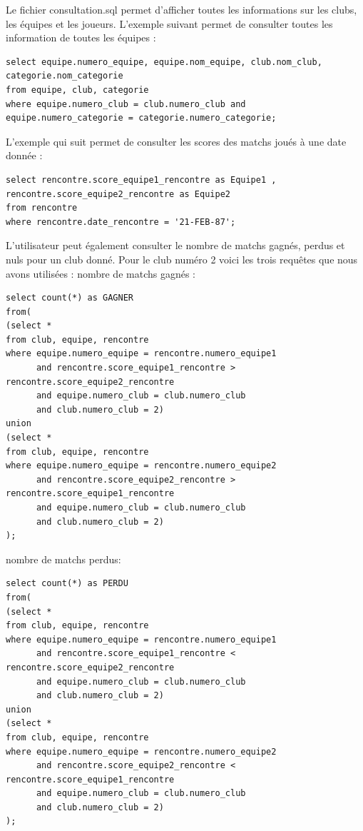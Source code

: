\documentclass{article}
\begin{document}
Le fichier consultation.sql permet d'afficher toutes les informations sur les clubs, les équipes et les joueurs. 
L'exemple suivant permet de consulter toutes les information de toutes les équipes : \\

\begin{verbatim}
select equipe.numero_equipe, equipe.nom_equipe, club.nom_club, categorie.nom_categorie
from equipe, club, categorie
where equipe.numero_club = club.numero_club and equipe.numero_categorie = categorie.numero_categorie;
\end{verbatim}

L'exemple qui suit permet de consulter les scores des matchs joués à une date donnée : \\

\begin{verbatim}
select rencontre.score_equipe1_rencontre as Equipe1 , rencontre.score_equipe2_rencontre as Equipe2
from rencontre
where rencontre.date_rencontre = '21-FEB-87'; 
\end{verbatim}

L'utilisateur peut également consulter le nombre de matchs gagnés, perdus et nuls pour un club donné.
Pour le club numéro 2 voici les trois requêtes que nous avons utilisées :
nombre de matchs gagnés : \\

\begin{verbatim}
select count(*) as GAGNER
from(
(select *
from club, equipe, rencontre
where equipe.numero_equipe = rencontre.numero_equipe1 
      and rencontre.score_equipe1_rencontre > rencontre.score_equipe2_rencontre
      and equipe.numero_club = club.numero_club
      and club.numero_club = 2)
union
(select *
from club, equipe, rencontre 
where equipe.numero_equipe = rencontre.numero_equipe2
      and rencontre.score_equipe2_rencontre > rencontre.score_equipe1_rencontre
      and equipe.numero_club = club.numero_club
      and club.numero_club = 2)
);
\end{verbatim}

nombre de matchs perdus: \\

\begin{verbatim}
select count(*) as PERDU
from(
(select *
from club, equipe, rencontre
where equipe.numero_equipe = rencontre.numero_equipe1 
      and rencontre.score_equipe1_rencontre < rencontre.score_equipe2_rencontre
      and equipe.numero_club = club.numero_club
      and club.numero_club = 2)
union
(select *
from club, equipe, rencontre 
where equipe.numero_equipe = rencontre.numero_equipe2
      and rencontre.score_equipe2_rencontre < rencontre.score_equipe1_rencontre
      and equipe.numero_club = club.numero_club
      and club.numero_club = 2)
);
\end{verbatim}
\end{document}
